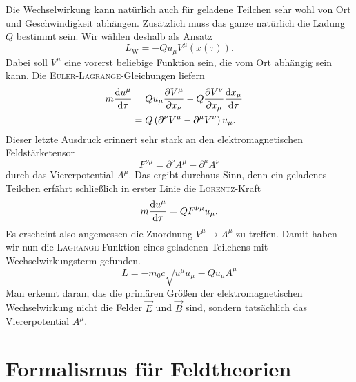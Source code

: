 Die Wechselwirkung kann natürlich auch für geladene Teilchen sehr wohl von Ort und Geschwindigkeit abhängen. Zusätzlich muss das ganze natürlich die Ladung $Q$ bestimmt sein. Wir wählen deshalb als Ansatz
\begin{equation*}
L_\text{W} = -Q u_\mu V^\mu\left(x(\tau)\right).
\end{equation*}
Dabei soll $V^\mu$ eine vorerst beliebige Funktion sein, die vom Ort abhängig sein kann. Die \textsc{Euler-Lagrange}-Gleichungen liefern 
\begin{align*}
m\frac{\mathrm{d}{u^\mu}}{\mathrm{d}{\tau}} &= Q u_\mu\frac{\partial{V^\mu}}{\partial{x_\nu}}-Q\frac{\partial{V^\nu}}{\partial{x_\mu}}\frac{\mathrm{d}{x_\mu}}{\mathrm{d}{\tau}} = \\
& = Q\left(\partial^\nu V^\mu - \partial^\mu V^\nu \right)u_\mu.
\end{align*}
Dieser letzte Ausdruck erinnert sehr stark an den elektromagnetischen Feldstärketensor
\begin{equation*}
F^{\nu\mu}=\partial^\nu A^\mu - \partial^\mu A^\nu
\end{equation*}
durch das Viererpotential $A^\mu$. Das ergibt durchaus Sinn, denn ein geladenes Teilchen erfährt schließlich in erster Linie die \textsc{Lorentz}-Kraft
\begin{equation*}
m\frac{\mathrm{d}{u^\mu}}{\mathrm{d}{\tau}} = QF^{\nu\mu}u_\mu.
\end{equation*}
Es erscheint also angemessen die Zuordnung $V^\mu\rightarrow A^\mu$ zu treffen. Damit haben wir nun die \textsc{Lagrange}-Funktion eines geladenen Teilchens mit Wechselwirkungsterm gefunden.
\begin{equation*}
L = -m_0c\sqrt{u^\mu u_\mu} - Qu_\mu A^\mu
\end{equation*}
Man erkennt daran, das die primären Größen der elektromagnetischen Wechselwirkung nicht die Felder $\vec{E}$ und $\vec{B}$ sind, sondern tatsächlich das Viererpotential $A^\mu$. 
\newpage

\section[\textsc{Lagrange}: Feldtheorien]{Formalismus für Feldtheorien}

